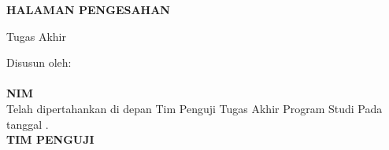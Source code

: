 
\newpage
{}
\begin{center}
        \textbf{\large \MakeUppercase{halaman pengesahan}}
\end{center}

\begin{center}
    Tugas Akhir
\end{center}

\begin{center}
        \textbf{\large \MakeUppercase {\judulid}}
\end{center}

\begin{center}
    Disusun oleh:\\
    \textbf{\penulis}\\
    \textbf{NIM \nim}\\[1.5cm]

    Telah dipertahankan di depan Tim Penguji Tugas Akhir Program Studi {\prodi} {\fakultas} {\universitas} Pada tanggal {\tglpengesahan}.\\[1cm]

    \textbf{\MakeUppercase{TIM PENGUJI}}
\end{center}

